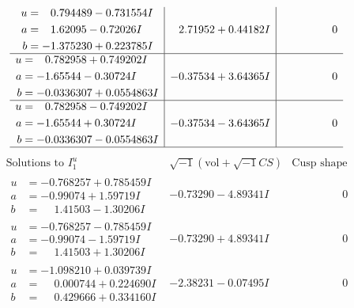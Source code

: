 \documentclass[1p]{elsarticle_modified}
\theoremstyle{definition}
\newcommand{\I}{\sqrt{-1}}
\begin{document}
$$\begin{array}{c|c|c}
\begin{aligned}
u &= \phantom{-}0.794489 - 0.731554 I \\
a &= \phantom{-}1.62095 - 0.72026 I \\
b &= -1.375230 + 0.223785 I\end{aligned}
 & \phantom{-}2.71952 + 0.44182 I & \phantom{-0.000000 } 0 \\ \hline\begin{aligned}
u &= \phantom{-}0.782958 + 0.749202 I \\
a &= -1.65544 - 0.30724 I \\
b &= -0.0336307 + 0.0554863 I\end{aligned}
 & -0.37534 + 3.64365 I & \phantom{-0.000000 } 0 \\ \hline\begin{aligned}
u &= \phantom{-}0.782958 - 0.749202 I \\
a &= -1.65544 + 0.30724 I \\
b &= -0.0336307 - 0.0554863 I\end{aligned}
 & -0.37534 - 3.64365 I & \phantom{-0.000000 } 0\\
 \hline 
 \end{array}$$\newpage$$\begin{array}{c|c|c}  
\text{Solutions to }I^u_{1}& \I (\text{vol} + \sqrt{-1}CS) & \text{Cusp shape}\\
 \hline 
\begin{aligned}
u &= -0.768257 + 0.785459 I \\
a &= -0.99074 + 1.59719 I \\
b &= \phantom{-}1.41503 - 1.30206 I\end{aligned}
 & -0.73290 - 4.89341 I & \phantom{-0.000000 } 0 \\ \hline\begin{aligned}
u &= -0.768257 - 0.785459 I \\
a &= -0.99074 - 1.59719 I \\
b &= \phantom{-}1.41503 + 1.30206 I\end{aligned}
 & -0.73290 + 4.89341 I & \phantom{-0.000000 } 0 \\ \hline\begin{aligned}
u &= -1.098210 + 0.039739 I \\
a &= \phantom{-}0.000744 + 0.224690 I \\
b &= \phantom{-}0.429666 + 0.334160 I\end{aligned}
 & -2.38231 - 0.07495 I & \phantom{-0.000000 } 0 \\ \hline\begin{aligned}

\end{aligned}
\end{array}$$
\end{document}
